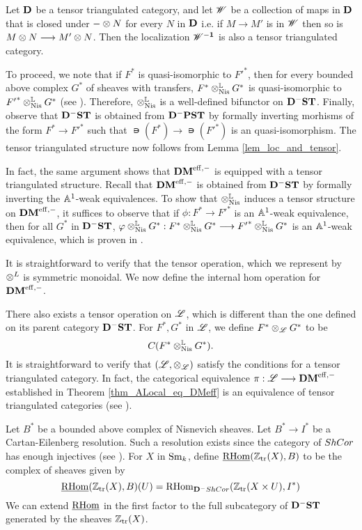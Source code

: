 \begin{lem}\label{lem_loc_and_tensor}
Let $\DCat$ be a tensor triangulated category, and let $\Cat{W}$
be a collection of maps in $\DCat$ that is closed under $-\tensor 
N$ for every $N$ in $\DCat$ i.e. if $M \to M'$ is in $\Cat{W}$ then 
so is $M \tensor N \to M' \tensor N$. Then the localization $\DCat 
[\Cat{W}^{-1}]$ is also a tensor triangulated category.
\end{lem}

To proceed, we note that if $F^*$ is quasi-isomorphic to ${F'}^*$,
then for every bounded above complex $G^*$ of sheaves with 
transfers, $F^* \tLNis G^*$ is quasi-isomorphic to 
${F'}^* \tLNis G^*$ (see \cite[8.16]{MVW}). Therefore, $\tLNis$ is 
a well-defined bifunctor on $\DShCor$. Finally, observe that 
$\DShCor$ is obtained from $\DCat^-\PST$ by formally inverting 
morhisms of the form $F^* \to {F'}^*$ such that $\nis(F^*) \to 
\nis({F'}^*)$ is an quasi-isomorphism. The tensor triangulated 
structure now follows from Lemma \ref{lem_loc_and_tensor}.

In fact, the same argument shows that $\DMeff$ is equipped with a
tensor triangulated structure. Recall that $\DMeff$ is obtained
from $\DShCor$ by formally inverting the $\A^1$-weak equivalences.
To show that $\tLNis$ induces a tensor structure on $\DMeff$, it
suffices to observe that if $\phi : F^* \to {F'}^*$ is an $\A^1$-weak 
equivalence, then for all $G^*$ in $\DShCor$, $\phi \tLNis G^* : 
F^* \tLNis G^* \to {F'}^* \tLNis G^*$ is an $\A^1$-weak 
equivalence, which is proven in \cite[9.5]{MVW}.

It is straightforward to verify that the tensor operation, which
we represent by $\tDM$ is symmetric monoidal. We now define the 
internal hom operation for $\DMeff$.

There also exists a tensor operation on $\ALocal$, which is 
different than the one defined on its parent category $\DShCor$.
For $F^*, G^*$ in $\ALocal$, we define $F^* \tAL G^*$ to be
\[
\suslC[]( F^* \tLNis G^* ).
\]
It is straightforward to verify that $(\ALocal, \tAL)$ satisfy
the conditions for a tensor triangulated category. In fact, the
categorical equivalence $\pi : \ALocal \to \DMeff$ established
in Theorem \ref{thm_ALocal_eq_DMeff} is an equivalence of tensor
triangulated categories (see \cite[14.11]{MVW}).

\begin{defn}
Let $B^*$ be a bounded above complex of Nisnevich sheaves. Let $B^*
\to I^*$ be a Cartan-Eilenberg resolution. Such a resolution 
exists since the category of $\ShCor$ has enough injectives (see 
\cite[6.19]{MVW}). For $X$ in $\Sm$, define 
$\sheaf{\rhom}(\Ztr(X), B)$ to be the complex of sheaves given by
\[
\sheaf{\rhom}(\Ztr(X), B)(U) = \rhom_{\DCat^-\ShCor}(\Ztr(X \times U),
I^*)
\]
We can extend $\sheaf{\rhom}$ in the first factor to the full 
subcategory of $\DShCor$ generated by the sheaves $\Ztr(X)$.
\end{defn}


